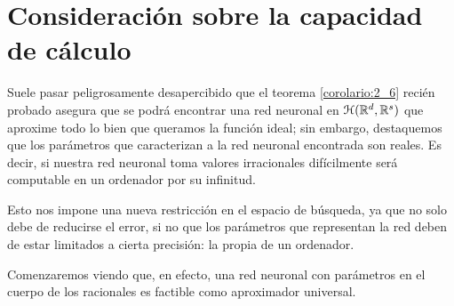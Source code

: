 \section{Consideración sobre la capacidad de cálculo}
\label{ch04:capacidad-calculo}

Suele pasar peligrosamente desapercibido que el teorema  \ref{corolario:2_6} recién probado asegura
que se podrá encontrar una red neuronal en $\mathcal{H}(\mathbb{R}^d,\mathbb{R}^s)$
que aproxime todo lo bien que queramos la función ideal; sin embargo, destaquemos que los parámetros que caracterizan a la red neuronal encontrada son reales. Es decir, 
si nuestra red neuronal toma valores irracionales difícilmente será computable en un ordenador por su infinitud. 

Esto nos impone una nueva restricción en el espacio de búsqueda, ya que no solo debe de reducirse el error, si no que los parámetros que representan la red deben de estar limitados a cierta precisión: la propia de un ordenador.


Comenzaremos viendo que, en efecto, una red neuronal con parámetros en el cuerpo de los racionales es factible como aproximador universal. 


